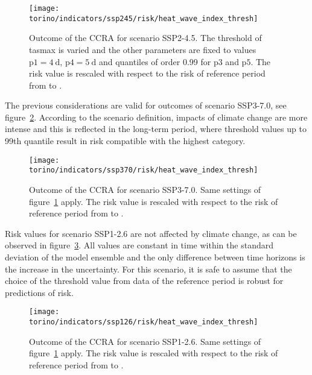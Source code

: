 \begin{figure}[h]
  \centering
  \texttt{[image: torino/indicators/ssp245/risk/heat\_wave\_index\_thresh]}
  \caption{Outcome of the \gls{CCRA} for scenario SSP2-4.5. The threshold of \gls{tasmax} is varied and the other parameters are fixed to values $\mathrm{p1} = \qty{4}{\day}$, $\mathrm{p4} = \qty{5}{\day}$ and quantiles of order 0.99 for $\mathrm{p3}$ and $\mathrm{p5}$. The risk value is rescaled with respect to the risk of reference period from  to .}
  \label{fig:ssp245_risk_heat_wave_index_thresh-heat_wave_max_length_thresh_tasmax}
\end{figure}

The previous considerations are valid for outcomes of scenario SSP3-7.0, see figure~\ref{fig:ssp370_risk_heat_wave_index_thresh-heat_wave_max_length_thresh_tasmax}. According to the scenario definition, impacts of climate change are more intense and this is reflected in the long-term period, where threshold values up to 99th quantile result in risk compatible with the highest category.

\begin{figure}[h]
  \centering
  \texttt{[image: torino/indicators/ssp370/risk/heat\_wave\_index\_thresh]}
  \caption{Outcome of the \gls{CCRA} for scenario SSP3-7.0. Same settings of figure~\ref{fig:ssp245_risk_heat_wave_index_thresh-heat_wave_max_length_thresh_tasmax} apply. The risk value is rescaled with respect to the risk of reference period from  to .}
  \label{fig:ssp370_risk_heat_wave_index_thresh-heat_wave_max_length_thresh_tasmax}
\end{figure}

Risk values for scenario SSP1-2.6 are not affected by climate change, as can be observed in figure~\ref{fig:ssp126_risk_heat_wave_index_thresh-heat_wave_max_length_thresh_tasmax}. All values are constant in time within the standard deviation of the model ensemble and the only difference between time horizons is the increase in the uncertainty. For this scenario, it is safe to assume that the choice of the threshold value from data of the reference period is robust for predictions of risk.

\begin{figure}[h]
  \centering
  \texttt{[image: torino/indicators/ssp126/risk/heat\_wave\_index\_thresh]}
  \caption{Outcome of the \gls{CCRA} for scenario SSP1-2.6. Same settings of figure~\ref{fig:ssp245_risk_heat_wave_index_thresh-heat_wave_max_length_thresh_tasmax} apply. The risk value is rescaled with respect to the risk of reference period from  to .}
  \label{fig:ssp126_risk_heat_wave_index_thresh-heat_wave_max_length_thresh_tasmax}
\end{figure}

